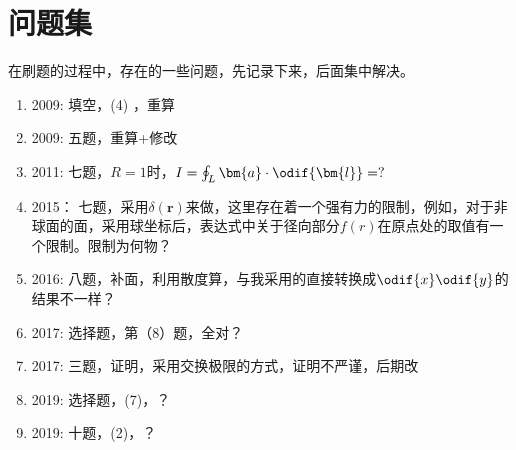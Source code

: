 \chapter*{问题集}
在刷题的过程中，存在的一些问题，先记录下来，后面集中解决。
\begin{enumerate}
	\renewcommand{\labelenumi}{\arabic{enumi}.}
	\item 
	2009: 填空，(4) ，重算
	\item 
	2009: 五题，重算+修改
	\item
	2011: 七题，$ R=1 $时，$ I=\oint_{L} \bm{a} \cdot \odif{\bm{l}}=?    $
	\item 
	2015： 七题，采用$ \delta(\bm{r}) $来做，这里存在着一个强有力的限制，例如，对于非球面的面，采用球坐标后，表达式中关于径向部分$ f(r) $在原点处的取值有一个限制。限制为何物？
	\item 
	2016: 八题，补面，利用散度算，与我采用的直接转换成$ \odif{x}\odif{y} $的结果不一样？
	\item 
	2017: 选择题，第（8）题，全对？
	\item 
	2017: 三题，证明，采用交换极限的方式，证明不严谨，后期改
	
	\item 
	2019: 选择题，(7)，？
	\item 
	2019: 十题，(2)，？
	
\end{enumerate}